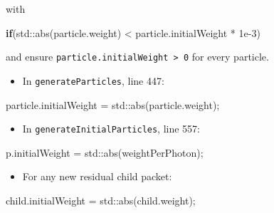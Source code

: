 \documentclass[
]{article}
\newenvironment{Shaded}{}{}
\newcommand{\BuiltInTok}[1]{\textcolor[rgb]{0.00,0.50,0.00}{#1}}
\newcommand{\ControlFlowTok}[1]{\textcolor[rgb]{0.00,0.44,0.13}{\textbf{#1}}}
\newcommand{\FloatTok}[1]{\textcolor[rgb]{0.25,0.63,0.44}{#1}}
\newcommand{\NormalTok}[1]{#1}
\newcommand{\OperatorTok}[1]{\textcolor[rgb]{0.40,0.40,0.40}{#1}}
\providecommand{\tightlist}{%
  \setlength{\itemsep}{0pt}\setlength{\parskip}{0pt}}
\begin{document}
with

\begin{Shaded}
\begin{Highlighting}[]
\ControlFlowTok{if}\OperatorTok{(}\BuiltInTok{std::}\NormalTok{abs}\OperatorTok{(}\NormalTok{particle}\OperatorTok{.}\NormalTok{weight}\OperatorTok{)} \OperatorTok{\textless{}}\NormalTok{ particle}\OperatorTok{.}\NormalTok{initialWeight }\OperatorTok{*} \FloatTok{1e{-}3}\OperatorTok{)}
\end{Highlighting}
\end{Shaded}

and ensure \texttt{particle.initialWeight\ \textgreater{}\ 0} for every
particle.

\begin{itemize}
\tightlist
\item
  In \texttt{generateParticles}, line 447:
\end{itemize}

\begin{Shaded}
\begin{Highlighting}[]
\NormalTok{particle}\OperatorTok{.}\NormalTok{initialWeight }\OperatorTok{=} \BuiltInTok{std::}\NormalTok{abs}\OperatorTok{(}\NormalTok{particle}\OperatorTok{.}\NormalTok{weight}\OperatorTok{);}
\end{Highlighting}
\end{Shaded}

\begin{itemize}
\tightlist
\item
  In \texttt{generateInitialParticles}, line 557:
\end{itemize}

\begin{Shaded}
\begin{Highlighting}[]
\NormalTok{p}\OperatorTok{.}\NormalTok{initialWeight }\OperatorTok{=} \BuiltInTok{std::}\NormalTok{abs}\OperatorTok{(}\NormalTok{weightPerPhoton}\OperatorTok{);}
\end{Highlighting}
\end{Shaded}

\begin{itemize}
\tightlist
\item
  For any new residual child packet:
\end{itemize}

\begin{Shaded}
\begin{Highlighting}[]
\NormalTok{child}\OperatorTok{.}\NormalTok{initialWeight }\OperatorTok{=} \BuiltInTok{std::}\NormalTok{abs}\OperatorTok{(}\NormalTok{child}\OperatorTok{.}\NormalTok{weight}\OperatorTok{);}
\end{Highlighting}
\end{Shaded}
\end{document}
